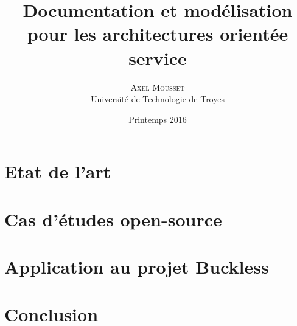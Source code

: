 \documentclass{article}
\title{\vspace{-15mm}\fontsize{24pt}{10pt}\selectfont\textbf{Documentation et modélisation pour les architectures orientée service}}
\author{
    \large
    \textsc{Axel Mousset}\\[2mm]
    \normalsize Université de Technologie de Troyes \\
    \vspace{-5mm}
}
\date{Printemps 2016}
\begin{document}
    \maketitle

    \begin{abstract}
        
    \end{abstract}

    \newpage
    \tableofcontents

    \thispagestyle{fancy}

    \newpage
    \section{Etat de l'art}
        

    \newpage
    \section{Cas d'études open-source}
        

    \newpage
    \section{Application au projet Buckless}
        

    \newpage
    \section{Conclusion}
        

    \newpage
    \appendix
    

    \newpage
        \begin{thebibliography}{1}
            
        \end{thebibliography}
\end{document}
